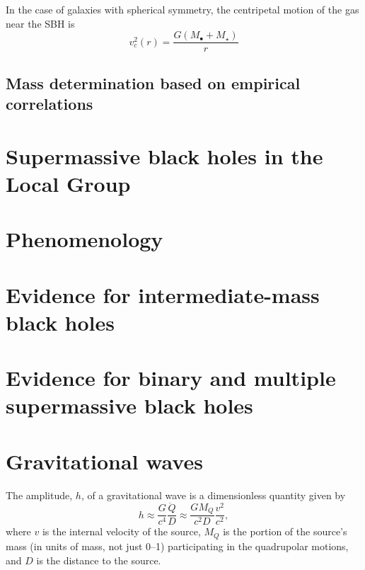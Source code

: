 \documentclass[degn-notes.tex]{subfiles}
\begin{document}
In the case of galaxies with spherical symmetry, the centripetal motion of the gas near the SBH is
%
\begin{displaymath}
  v_c^2(r) = \frac{G (M_\bullet + M_\star)}{r}
%
  \tag{Merritt 2.22}
  \label{merritt:2.22}
\end{displaymath}


\setcounter{subsection}{2}
\subsection{Mass determination based on empirical correlations}





\section{Supermassive black holes in the Local Group}

\section{Phenomenology}

\section{Evidence for intermediate-mass black holes}

\section{Evidence for binary and multiple supermassive black holes}

\section{Gravitational waves}

The amplitude, $h$, of a gravitational wave is a dimensionless quantity given by
%
\begin{displaymath}
  h \approx
  \frac{G}{c^4} \frac{\ddot{Q}}{D} \approx
  \frac{G M_Q}{c^2 D} \frac{v^2}{c^2},
%
  \tag{Merritt 2.55}
  \label{merritt:2.55}
\end{displaymath}
%
where $v$ is the internal velocity of the source, $M_Q$ is the portion of the source's mass (in units of mass, not just 0--1) participating in the quadrupolar motions, and $D$ is the distance to the source.
\end{document}
